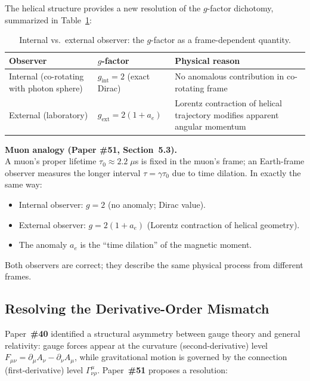 \documentclass[12pt,letterpaper]{article}
\newcommand{\paperno}[1]{\textbf{\#{}#1}}
\begin{document}
The helical structure provides a new resolution of the $g$-factor dichotomy, summarized in Table~\ref{tab:observers}:

\begin{table}[h!]
\centering
\renewcommand{\arraystretch}{1.4}
\begin{tabular}{p{4.5cm}p{3.5cm}p{5.0cm}}
\toprule
\textbf{Observer} & \textbf{$g$-factor} & \textbf{Physical reason} \\
\midrule
Internal (co-rotating with photon sphere) &
  $g_{\mathrm{int}} = 2$ (exact Dirac) &
  No anomalous contribution in co-rotating frame \\
\addlinespace[0.2cm]
External (laboratory) &
  $g_{\mathrm{ext}} = 2(1+a_e)$ &
  Lorentz contraction of helical trajectory modifies apparent angular momentum \\
\bottomrule
\end{tabular}
\caption{Internal vs.\ external observer: the $g$-factor as a frame-dependent quantity.}
\label{tab:observers}
\end{table}

\begin{mdframed}[style=purplebox]
\textbf{Muon analogy (Paper \#51, Section~5.3).}\\
A muon's proper lifetime $\tau_0\approx 2.2\;\mu$s is fixed in the muon's frame;
an Earth-frame observer measures the longer interval $\tau=\gamma\tau_0$ due to time dilation.
In exactly the same way:
\begin{itemize}[leftmargin=2em, itemsep=2pt]
  \item Internal observer: $g=2$ (no anomaly; Dirac value).
  \item External observer: $g=2(1+a_e)$ (Lorentz contraction of helical geometry).
  \item The anomaly $a_e$ is the ``time dilation'' of the magnetic moment.
\end{itemize}
Both observers are correct; they describe the same physical process from different frames.
\end{mdframed}

\subsection{Resolving the Derivative-Order Mismatch}
\label{subsec:mismatch}

Paper~\paperno{40} identified a structural asymmetry between gauge theory and general
relativity: gauge forces appear at the curvature (second-derivative) level
$F_{\mu\nu} = \partial_\mu A_\nu - \partial_\nu A_\mu$,
while gravitational motion is governed by the connection (first-derivative) level
$\Gamma^\mu_{\nu\rho}$.
Paper~\paperno{51} proposes a resolution:
\end{document}
